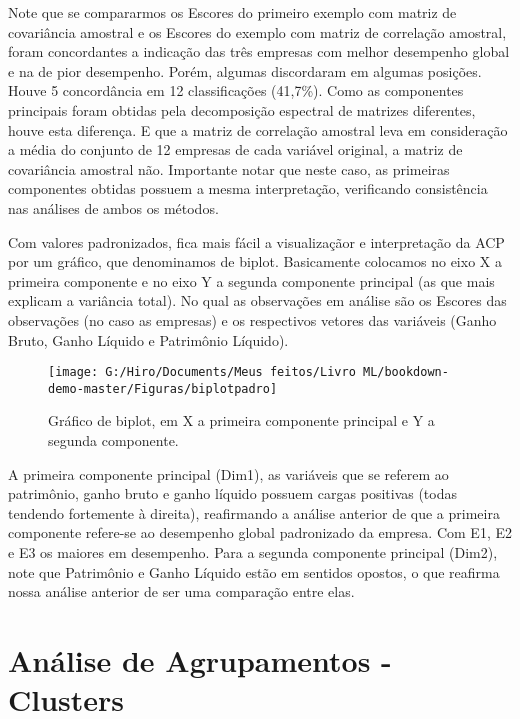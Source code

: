 \documentclass[
]{book}
\begin{document}
Note que se compararmos os Escores do primeiro exemplo com matriz de covariância amostral e os Escores do exemplo com matriz de correlação amostral, foram concordantes a indicação das três empresas com melhor desempenho global e na de pior desempenho. Porém, algumas discordaram em algumas posições. Houve 5 concordância em 12 classificações (41,7\%). Como as componentes principais foram obtidas pela decomposição espectral de matrizes diferentes, houve esta diferença. E que a matriz de correlação amostral leva em consideração a média do conjunto de 12 empresas de cada variável original, a matriz de covariância amostral não. Importante notar que neste caso, as primeiras componentes obtidas possuem a mesma interpretação, verificando consistência nas análises de ambos os métodos.

Com valores padronizados, fica mais fácil a visualizaçãor e interpretação da ACP por um gráfico, que denominamos de biplot. Basicamente colocamos no eixo X a primeira componente e no eixo Y a segunda componente principal (as que mais explicam a variância total). No qual as observações em análise são os Escores das observações (no caso as empresas) e os respectivos vetores das variáveis (Ganho Bruto, Ganho Líquido e Patrimônio Líquido).

\begin{figure}

{\centering \texttt{[image: G:/Hiro/Documents/Meus feitos/Livro ML/bookdown-demo-master/Figuras/biplotpadro]} 

}

\caption{Gráfico de biplot, em X a primeira componente principal e Y a segunda componente.}\label{fig:biplotpadro}
\end{figure}



A primeira componente principal (Dim1), as variáveis que se referem ao patrimônio, ganho bruto e ganho líquido possuem cargas positivas (todas tendendo fortemente à direita), reafirmando a análise anterior de que a primeira componente refere-se ao desempenho global padronizado da empresa. Com E1, E2 e E3 os maiores em desempenho.
Para a segunda componente principal (Dim2), note que Patrimônio e Ganho Líquido estão em sentidos opostos, o que reafirma nossa análise anterior de ser uma comparação entre elas.

\hypertarget{anuxe1lise-de-agrupamentos---clusters}{%
\section{Análise de Agrupamentos - Clusters}\label{anuxe1lise-de-agrupamentos---clusters}}
\end{document}
